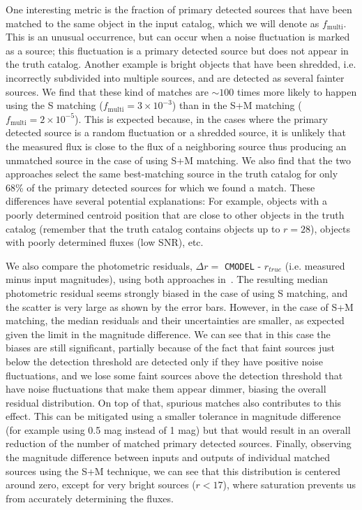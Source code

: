 \documentclass[\docopts]{\docclass}
\begin{document}
One interesting metric is the fraction of primary detected sources that have been matched to the same object in the input catalog, which we will denote as $f_{\mathrm{multi}}$. This is an unusual occurrence, but can occur when a noise fluctuation is marked as a source; this fluctuation is a primary detected source but does not appear in the truth catalog. Another example is bright objects that have been shredded, i.e. incorrectly subdivided into multiple sources, and are detected as several fainter sources. We find that these kind of matches are $\sim 100$ times more likely to happen using the \textsf{S} matching ($f_{\mathrm{multi}} = 3 \times 10^{-3}$) than in the \textsf{S+M} matching ($ f_{\mathrm{multi}} = 2 \times 10^{-5}$). This is expected because, in the cases where the primary detected source is a random fluctuation or a shredded source, it is unlikely that the measured flux is close to the flux of a neighboring source thus producing an unmatched source in the case of using \textsf{S+M} matching. We also find that the two approaches select the same best-matching source in the truth catalog for only 68\% of the primary detected sources for which we found a match. These differences have several potential explanations: For example, objects with a poorly determined centroid position that are close to other objects in the truth catalog (remember that the truth catalog contains objects up to $r=28$), objects with poorly determined fluxes (low SNR), etc.

We also compare the photometric residuals, $\Delta r = $ \texttt{CMODEL} - $r_{true}$ (i.e. measured minus input magnitudes), using both approaches in~. The resulting median photometric residual seems strongly biased in the case of using \textsf{S} matching, and the scatter is very large as shown by the error bars. However, in the case of \textsf{S+M} matching, the median residuals and their uncertainties are smaller, as expected given the limit in the magnitude difference. We can see that in this case the biases are still significant, partially because of the fact that faint sources just below the detection threshold are detected only if they have positive noise fluctuations, and we lose some faint sources above the detection threshold that have noise fluctuations that make them appear dimmer, biasing the overall residual distribution. On top of that, spurious matches also contributes to this effect. This can be mitigated using a smaller tolerance in magnitude difference (for example using 0.5 mag instead of 1 mag) but that would result in an overall reduction of the number of matched primary detected sources. Finally, observing the magnitude difference between inputs and outputs of individual matched sources using the \textsf{S+M} technique, we can see that this distribution is centered around zero, except for very bright sources ($r < 17$), where saturation prevents us from accurately determining the fluxes. 
\end{document}

